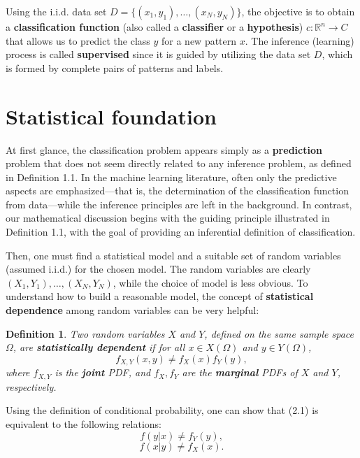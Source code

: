 \documentclass{report}
\newtheorem{definition}{Definition}[chapter]
\begin{document}
Using the i.i.d. data set $D = \{(x_1,y_1),\dots,(x_N,y_N)\}$, the objective is to obtain a \textbf{classification function} (also called a \textbf{classifier} or a \textbf{hypothesis}) $c : \mathbb{R}^n \to C$ that allows us to predict the class $y$ for a new pattern $x$. The inference (learning) process is called \textbf{supervised} since it is guided by utilizing the data set $D$, which is formed by complete pairs of patterns and labels.

\section{Statistical foundation}
At first glance, the classification problem appears simply as a \textbf{prediction} problem that does not seem directly related to any inference problem, as defined in Definition 1.1. In the machine learning literature, often only the predictive aspects are emphasized—that is, the determination of the classification function from data—while the inference principles are left in the background. In contrast, our mathematical discussion begins with the guiding principle illustrated in Definition 1.1, with the goal of providing an inferential definition of classification.

Then, one must find a statistical model and a suitable set of random variables (assumed i.i.d.) for the chosen model. The random variables are clearly $(X_1,Y_1),\dots,(X_N,Y_N)$, while the choice of model is less obvious. To understand how to build a reasonable model, the concept of \textbf{statistical dependence} among random variables can be very helpful:

\begin{definition}
Two random variables $X$ and $Y$, defined on the same sample space $\Omega$, are \textbf{statistically dependent} if for all $x\in X(\Omega)$ and $y \in Y(\Omega)$,
\begin{equation}
f_{X,Y}(x,y) \neq f_X(x)f_Y(y),
\end{equation}
where $f_{X,Y}$ is the \textbf{joint} PDF, and $f_X,f_Y$ are the \textbf{marginal} PDFs of $X$ and $Y$, respectively.
\end{definition}

Using the definition of conditional probability, one can show that (2.1) is equivalent to the following relations:
\begin{equation}
f(y|x) \neq f_Y(y),
\end{equation}
\begin{equation}
f(x|y) \neq f_X(x).
\end{equation}
\end{document}
